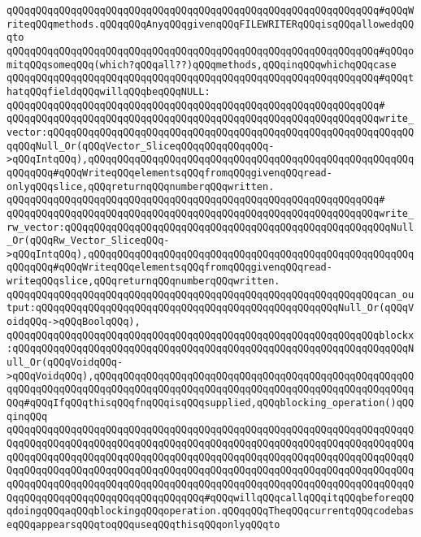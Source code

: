\verb|qQQqqQQqqQQqqQQqqQQqqQQqqQQqqQQqqQQqqQQqqQQqqQQqqQQqqQQqqQQqqQQq#qQQqWriteqQQqmethods.qQQqqQQqAnyqQQqgivenqQQqFILEWRITERqQQqisqQQqallowedqQQqto|\newline
\verb|qQQqqQQqqQQqqQQqqQQqqQQqqQQqqQQqqQQqqQQqqQQqqQQqqQQqqQQqqQQqqQQq#qQQqomitqQQqsomeqQQq(which?qQQqall??)qQQqmethods,qQQqinqQQqwhichqQQqcase|\newline
\verb|qQQqqQQqqQQqqQQqqQQqqQQqqQQqqQQqqQQqqQQqqQQqqQQqqQQqqQQqqQQqqQQq#qQQqthatqQQqfieldqQQqwillqQQqbeqQQqNULL:|\newline
\verb|qQQqqQQqqQQqqQQqqQQqqQQqqQQqqQQqqQQqqQQqqQQqqQQqqQQqqQQqqQQqqQQq#|\newline
\verb|qQQqqQQqqQQqqQQqqQQqqQQqqQQqqQQqqQQqqQQqqQQqqQQqqQQqqQQqqQQqqQQqwrite_vector:qQQqqQQqqQQqqQQqqQQqqQQqqQQqqQQqqQQqqQQqqQQqqQQqqQQqqQQqqQQqqQQqqQQqNull_Or(qQQqVector_SliceqQQqqQQqqQQqqQQq->qQQqIntqQQq),qQQqqQQqqQQqqQQqqQQqqQQqqQQqqQQqqQQqqQQqqQQqqQQqqQQqqQQqqQQqqQQq#qQQqWriteqQQqelementsqQQqfromqQQqgivenqQQqread-onlyqQQqslice,qQQqreturnqQQqnumberqQQqwritten.|\newline
\verb|qQQqqQQqqQQqqQQqqQQqqQQqqQQqqQQqqQQqqQQqqQQqqQQqqQQqqQQqqQQqqQQq#|\newline
\verb|qQQqqQQqqQQqqQQqqQQqqQQqqQQqqQQqqQQqqQQqqQQqqQQqqQQqqQQqqQQqqQQqwrite_rw_vector:qQQqqQQqqQQqqQQqqQQqqQQqqQQqqQQqqQQqqQQqqQQqqQQqqQQqqQQqNull_Or(qQQqRw_Vector_SliceqQQq->qQQqIntqQQq),qQQqqQQqqQQqqQQqqQQqqQQqqQQqqQQqqQQqqQQqqQQqqQQqqQQqqQQqqQQqqQQq#qQQqWriteqQQqelementsqQQqfromqQQqgivenqQQqread-writeqQQqslice,qQQqreturnqQQqnumberqQQqwritten.|\newline
\newline
\verb|qQQqqQQqqQQqqQQqqQQqqQQqqQQqqQQqqQQqqQQqqQQqqQQqqQQqqQQqqQQqqQQqcan_output:qQQqqQQqqQQqqQQqqQQqqQQqqQQqqQQqqQQqqQQqqQQqqQQqqQQqNull_Or(qQQqVoidqQQq->qQQqBoolqQQq),|\newline
\newline
\verb|qQQqqQQqqQQqqQQqqQQqqQQqqQQqqQQqqQQqqQQqqQQqqQQqqQQqqQQqqQQqqQQqblockx:qQQqqQQqqQQqqQQqqQQqqQQqqQQqqQQqqQQqqQQqqQQqqQQqqQQqqQQqqQQqqQQqqQQqNull_Or(qQQqVoidqQQq->qQQqVoidqQQq),qQQqqQQqqQQqqQQqqQQqqQQqqQQqqQQqqQQqqQQqqQQqqQQqqQQqqQQqqQQqqQQqqQQqqQQqqQQqqQQqqQQqqQQqqQQqqQQqqQQqqQQqqQQqqQQqqQQqqQQqqQQqqQQq#qQQqIfqQQqthisqQQqfnqQQqisqQQqsupplied,qQQqblocking_operation()qQQqinqQQq|\newline
\verb|qQQqqQQqqQQqqQQqqQQqqQQqqQQqqQQqqQQqqQQqqQQqqQQqqQQqqQQqqQQqqQQqqQQqqQQqqQQqqQQqqQQqqQQqqQQqqQQqqQQqqQQqqQQqqQQqqQQqqQQqqQQqqQQqqQQqqQQqqQQqqQQqqQQqqQQqqQQqqQQqqQQqqQQqqQQqqQQqqQQqqQQqqQQqqQQqqQQqqQQqqQQqqQQqqQQqqQQqqQQqqQQqqQQqqQQqqQQqqQQqqQQqqQQqqQQqqQQqqQQqqQQqqQQqqQQqqQQqqQQqqQQqqQQqqQQqqQQqqQQqqQQqqQQqqQQqqQQqqQQqqQQqqQQqqQQqqQQqqQQqqQQqqQQqqQQqqQQqqQQqqQQqqQQqqQQqqQQqqQQqqQQq#qQQqwillqQQqcallqQQqitqQQqbeforeqQQqdoingqQQqaqQQqblockingqQQqoperation.qQQqqQQqTheqQQqcurrentqQQqcodebaseqQQqappearsqQQqtoqQQquseqQQqthisqQQqonlyqQQqto|\newline
